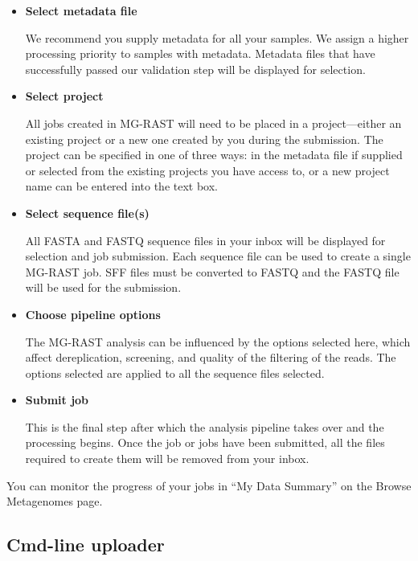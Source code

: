 \documentclass[12pt,fullpage]{report}
\begin{document}
\begin{itemize}

\item {\bf Select metadata file}

We recommend you supply metadata for all your samples. We assign a higher processing priority to samples with metadata. Metadata files that have successfully passed our validation step will be displayed for selection.

\item {\bf Select project}

All jobs created in MG-RAST will need to be placed in a project---either an existing project or a new one created by you during the submission. The project can be specified in one of three ways: in the metadata file if supplied or selected from the existing projects you have access to, or a new project name can be entered into the text box.

\item {\bf Select sequence file(s)}

All FASTA and FASTQ sequence files in your inbox will be displayed for selection and job submission. Each sequence file can be used to create a single MG-RAST job. SFF files must be converted to FASTQ and the FASTQ file will be used for the submission.

\item {\bf Choose pipeline options}

The MG-RAST analysis can be influenced by the options selected here, which affect dereplication, screening, and quality of the filtering of the reads. The options selected are applied to all the sequence files selected.

\item {\bf Submit job}

This is the final step after which the analysis pipeline takes over and the processing begins. Once the job or jobs have been submitted, all the files required to create them will be removed from your inbox.

\end{itemize}

\noindent
You can monitor the progress of your jobs in ``My Data Summary'' on the Browse Metagenomes page.
\subsection{Cmd-line uploader}
\end{document}
